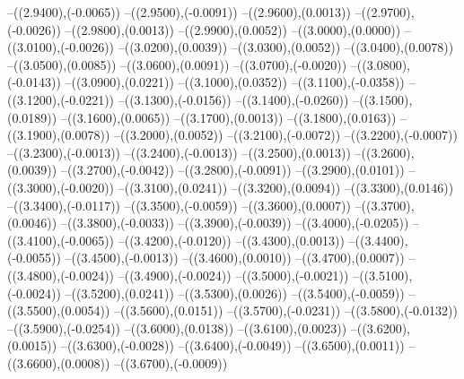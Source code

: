 {	--({\sx*(2.9400)},{\sy*(-0.0065)})
	--({\sx*(2.9500)},{\sy*(-0.0091)})
	--({\sx*(2.9600)},{\sy*(0.0013)})
	--({\sx*(2.9700)},{\sy*(-0.0026)})
	--({\sx*(2.9800)},{\sy*(0.0013)})
	--({\sx*(2.9900)},{\sy*(0.0052)})
	--({\sx*(3.0000)},{\sy*(0.0000)})
	--({\sx*(3.0100)},{\sy*(-0.0026)})
	--({\sx*(3.0200)},{\sy*(0.0039)})
	--({\sx*(3.0300)},{\sy*(0.0052)})
	--({\sx*(3.0400)},{\sy*(0.0078)})
	--({\sx*(3.0500)},{\sy*(0.0085)})
	--({\sx*(3.0600)},{\sy*(0.0091)})
	--({\sx*(3.0700)},{\sy*(-0.0020)})
	--({\sx*(3.0800)},{\sy*(-0.0143)})
	--({\sx*(3.0900)},{\sy*(0.0221)})
	--({\sx*(3.1000)},{\sy*(0.0352)})
	--({\sx*(3.1100)},{\sy*(-0.0358)})
	--({\sx*(3.1200)},{\sy*(-0.0221)})
	--({\sx*(3.1300)},{\sy*(-0.0156)})
	--({\sx*(3.1400)},{\sy*(-0.0260)})
	--({\sx*(3.1500)},{\sy*(0.0189)})
	--({\sx*(3.1600)},{\sy*(0.0065)})
	--({\sx*(3.1700)},{\sy*(0.0013)})
	--({\sx*(3.1800)},{\sy*(0.0163)})
	--({\sx*(3.1900)},{\sy*(0.0078)})
	--({\sx*(3.2000)},{\sy*(0.0052)})
	--({\sx*(3.2100)},{\sy*(-0.0072)})
	--({\sx*(3.2200)},{\sy*(-0.0007)})
	--({\sx*(3.2300)},{\sy*(-0.0013)})
	--({\sx*(3.2400)},{\sy*(-0.0013)})
	--({\sx*(3.2500)},{\sy*(0.0013)})
	--({\sx*(3.2600)},{\sy*(0.0039)})
	--({\sx*(3.2700)},{\sy*(-0.0042)})
	--({\sx*(3.2800)},{\sy*(-0.0091)})
	--({\sx*(3.2900)},{\sy*(0.0101)})
	--({\sx*(3.3000)},{\sy*(-0.0020)})
	--({\sx*(3.3100)},{\sy*(0.0241)})
	--({\sx*(3.3200)},{\sy*(0.0094)})
	--({\sx*(3.3300)},{\sy*(0.0146)})
	--({\sx*(3.3400)},{\sy*(-0.0117)})
	--({\sx*(3.3500)},{\sy*(-0.0059)})
	--({\sx*(3.3600)},{\sy*(0.0007)})
	--({\sx*(3.3700)},{\sy*(0.0046)})
	--({\sx*(3.3800)},{\sy*(-0.0033)})
	--({\sx*(3.3900)},{\sy*(-0.0039)})
	--({\sx*(3.4000)},{\sy*(-0.0205)})
	--({\sx*(3.4100)},{\sy*(-0.0065)})
	--({\sx*(3.4200)},{\sy*(-0.0120)})
	--({\sx*(3.4300)},{\sy*(0.0013)})
	--({\sx*(3.4400)},{\sy*(-0.0055)})
	--({\sx*(3.4500)},{\sy*(-0.0013)})
	--({\sx*(3.4600)},{\sy*(0.0010)})
	--({\sx*(3.4700)},{\sy*(0.0007)})
	--({\sx*(3.4800)},{\sy*(-0.0024)})
	--({\sx*(3.4900)},{\sy*(-0.0024)})
	--({\sx*(3.5000)},{\sy*(-0.0021)})
	--({\sx*(3.5100)},{\sy*(-0.0024)})
	--({\sx*(3.5200)},{\sy*(0.0241)})
	--({\sx*(3.5300)},{\sy*(0.0026)})
	--({\sx*(3.5400)},{\sy*(-0.0059)})
	--({\sx*(3.5500)},{\sy*(0.0054)})
	--({\sx*(3.5600)},{\sy*(0.0151)})
	--({\sx*(3.5700)},{\sy*(-0.0231)})
	--({\sx*(3.5800)},{\sy*(-0.0132)})
	--({\sx*(3.5900)},{\sy*(-0.0254)})
	--({\sx*(3.6000)},{\sy*(0.0138)})
	--({\sx*(3.6100)},{\sy*(0.0023)})
	--({\sx*(3.6200)},{\sy*(0.0015)})
	--({\sx*(3.6300)},{\sy*(-0.0028)})
	--({\sx*(3.6400)},{\sy*(-0.0049)})
	--({\sx*(3.6500)},{\sy*(0.0011)})
	--({\sx*(3.6600)},{\sy*(0.0008)})
	--({\sx*(3.6700)},{\sy*(-0.0009)})
}
